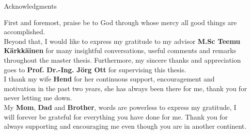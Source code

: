 \thispagestyle{empty}

\vspace*{20mm}

\begin{center}
	{ Acknowledgments}
\end{center}

\vspace{10mm}

\noindent First and foremost, praise be to God through whose mercy all good things are accomplished.\\

\noindent Beyond that, I would like to express my gratitude to my advisor \textbf{M.Sc Teemu Kärkkäinen} for many insightful conversations, useful comments and remarks throughout the master thesis. Furthermore, my sincere thanks and appreciation goes to \textbf{Prof. Dr.-Ing. Jörg Ott} for supervising this thesis.\\


\noindent I thank my wife  \textbf{Hend} for her continuous support, encouragement and motivation in the past two years, she has always been there for me, thank you for never letting me down.\\

\noindent My \textbf{Mom}, \textbf{Dad} and \textbf{Brother}, words are powerless to express my gratitude, I will forever be grateful for everything you have done for me. Thank you for always supporting and encouraging me even though you are in another continent.\\ 






\noindent 


\cleardoublepage{}

